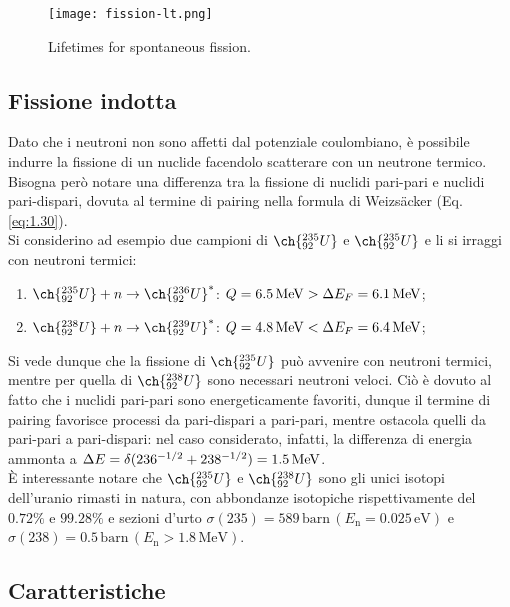 \begin{figure}[!hb]
	\centering
	\texttt{[image: fission-lt.png]}
	\caption{Lifetimes for spontaneous fission.}
	\label{fission-lt}
\end{figure}

\subsection{Fissione indotta}

Dato che i neutroni non sono affetti dal potenziale coulombiano, è possibile indurre la fissione di un nuclide facendolo scatterare con un neutrone termico. Bisogna però notare una differenza tra la fissione di nuclidi pari-pari e nuclidi pari-dispari, dovuta al termine di pairing nella formula di Weizsäcker (Eq. \ref{eq:1.30}).\\
Si considerino ad esempio due campioni di $ \ch{^{235}_{92} U} $ e $ \ch{^{235}_{92} U} $ e li si irraggi con neutroni termici:
\begin{enumerate}
	\item $ \ch{^{235}_{92} U} + n \rightarrow \ch{^{236}_{92} U}^* $: $ Q = 6.5\,\mathrm{MeV} > \Delta E_F = 6.1\,\mathrm{MeV} $;
	\item $ \ch{^{238}_{92} U} + n \rightarrow \ch{^{239}_{92} U}^* $: $ Q = 4.8\,\mathrm{MeV} < \Delta E_F = 6.4\,\mathrm{MeV} $;
\end{enumerate}
Si vede dunque che la fissione di $ \ch{^{235}_{92} U} $ può avvenire con neutroni termici, mentre per quella di $ \ch{^{238}_{92} U} $ sono necessari neutroni veloci. Ciò è dovuto al fatto che i nuclidi pari-pari sono energeticamente favoriti, dunque il termine di pairing favorisce processi da pari-dispari a pari-pari, mentre ostacola quelli da pari-pari a pari-dispari: nel caso considerato, infatti, la differenza di energia ammonta a $ \Delta E = \delta (236^{-1/2} + 238^{-1/2}) = 1.5\,\mathrm{MeV} $.\\
È interessante notare che $ \ch{^{235}_{92} U} $ e $ \ch{^{238}_{92} U} $ sono gli unici isotopi dell'uranio rimasti in natura, con abbondanze isotopiche rispettivamente del $ 0.72\% $ e $ 99.28\% $ e sezioni d'urto $\sigma(235) = 589 \, \text{barn} \, (E_\text{n}=0.025 \, \text{eV})$ e $\sigma(238) = 0.5 \, \text{barn} \, (E_\text{n}>1.8 \, \text{MeV})$.

\subsection{Caratteristiche}

